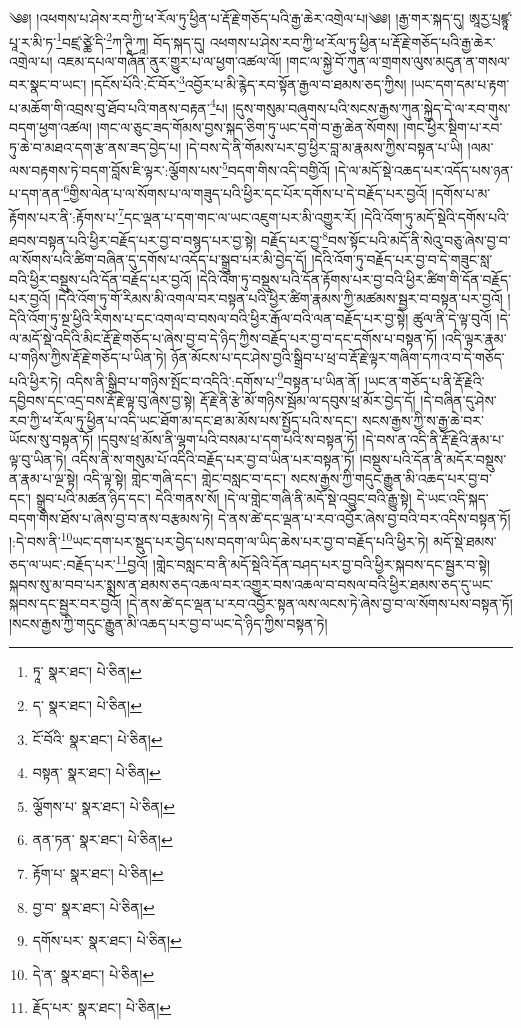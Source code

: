 \setcounter{footnote}{0} 
༄༅། །འཕགས་པ་ཤེས་རབ་ཀྱི་ཕ་རོལ་ཏུ་ཕྱིན་པ་རྡོ་རྗེ་གཅོད་པའི་རྒྱ་ཆེར་འགྲེལ་པ།༄༅། །རྒྱ་གར་སྐད་དུ། ཨཱརྱ་པྲཛྙཱ་པཱ་ར་མི་ཏ་\footnote{ཏཱ་  སྣར་ཐང་།  པེ་ཅིན། }བཛྲ་ཙྪེ་དི་\footnote{ད་  སྣར་ཐང་།  པེ་ཅིན། }ཀ་ཊཱི་ཀཱ། བོད་སྐད་དུ། འཕགས་པ་ཤེས་རབ་ཀྱི་ཕ་རོལ་ཏུ་ཕྱིན་པ་རྡོ་རྗེ་གཅོད་པའི་རྒྱ་ཆེར་འགྲེལ་པ། འཇམ་དཔལ་གཞོན་ནུར་གྱུར་པ་ལ་ཕྱག་འཚལ་ལོ། །གང་ལ་སྐྱེ་བོ་ཀུན་ལ་གྲགས་ལུས་མདུན་ན་གསལ་བར་སྣང་བ་ཡང་། །དངོས་པོའི་:ངོ་བོར་\footnote{ངོ་བོའི་  སྣར་ཐང་།  པེ་ཅིན། }འབྱོར་པ་མི་རྙེད་རབ་སྟོན་རྒྱལ་བ་ཐམས་ཅད་ཀྱིས། །ཡང་དག་དམ་པ་རྟག་པ་མཆོག་གི་འབྲས་བུ་ཐོབ་པའི་གནས་བརྟན་\footnote{བསྟན་  སྣར་ཐང་།  པེ་ཅིན། }པ། །དུས་གསུམ་བཞུགས་པའི་སངས་རྒྱས་ཀུན་སྐྱེད་དེ་ལ་རབ་གུས་བདག་ཕྱག་འཚལ། །གང་ལ་ཅུང་ཟད་གོམས་བྱས་སྐད་ཅིག་ཏུ་ཡང་དགེ་བ་རྒྱ་ཆེན་སོགས། །གང་ཕྱིར་སྡིག་པ་རབ་ཏུ་ཆེ་བ་མཐའ་དག་རྩ་ནས་ཟད་བྱེད་པ། །དེ་བས་དེ་ནི་གོམས་པར་བྱ་ཕྱིར་བླ་མ་རྣམས་ཀྱིས་བསྟན་པ་ཡི། །ལམ་ལས་བརྟགས་ཏེ་བདག་བློས་ཇི་ལྟར་:ལྕོགས་པས་\footnote{ལྕོགས་པ་  སྣར་ཐང་།  པེ་ཅིན། }བདག་གིས་འདི་བགྱིའོ། །དེ་ལ་མདོ་སྡེ་འཆད་པར་འདོད་པས་ཉན་པ་དག་ནན་\footnote{ནན་ཏན་  སྣར་ཐང་།  པེ་ཅིན། }གྱིས་ལེན་པ་ལ་སོགས་པ་ལ་གཟུད་པའི་ཕྱིར་དང་པོར་དགོས་པ་དེ་བརྗོད་པར་བྱའོ། །དགོས་པ་མ་རྟོགས་པར་ནི་:རྟོགས་པ་\footnote{རྟོག་པ་  སྣར་ཐང་།  པེ་ཅིན། }དང་ལྡན་པ་དག་གང་ལ་ཡང་འཇུག་པར་མི་འགྱུར་རོ། །དེའི་འོག་ཏུ་མདོ་སྡེའི་དགོས་པའི་ཐབས་བསྟན་པའི་ཕྱིར་བརྗོད་པར་བྱ་བ་བསྙད་པར་བྱ་སྟེ། བརྗོད་པར་བྱ་\footnote{བྱ་བ་  སྣར་ཐང་།  པེ་ཅིན། }བས་སྟོང་པའི་མདོ་ནི་སེའུ་བཅུ་ཞེས་བྱ་བ་ལ་སོགས་པའི་ཚིག་བཞིན་དུ་དགོས་པ་འདོད་པ་སྒྲུབ་པར་མི་བྱེད་དོ། །དེའི་འོག་ཏུ་བརྗོད་པར་བྱ་བ་དེ་གཟུང་སླ་བའི་ཕྱིར་བསྡུས་པའི་དོན་བརྗོད་པར་བྱའོ། །དེའི་འོག་ཏུ་བསྡུས་པའི་དོན་རྟོགས་པར་བྱ་བའི་ཕྱིར་ཚིག་གི་དོན་བརྗོད་པར་བྱའོ། །དེའི་འོག་ཏུ་གོ་རིམས་མི་འགལ་བར་བསྟན་པའི་ཕྱིར་ཚིག་རྣམས་ཀྱི་མཚམས་སྦྱར་བ་བསྟན་པར་བྱའོ། །དེའི་འོག་ཏུ་སྔ་ཕྱིའི་རིགས་པ་དང་འགལ་བ་བསལ་བའི་ཕྱིར་རྒོལ་བའི་ལན་བརྗོད་པར་བྱ་སྟེ། ཚུལ་ནི་དེ་ལྟ་བུའོ། །དེ་ལ་མདོ་སྡེ་འདིའི་མིང་རྡོ་རྗེ་གཅོད་པ་ཞེས་བྱ་བ་དེ་ཉིད་ཀྱིས་བརྗོད་པར་བྱ་བ་དང་དགོས་པ་བསྟན་ཏོ། །འདི་ལྟར་རྣམ་པ་གཉིས་ཀྱིས་རྡོ་རྗེ་གཅོད་པ་ཡིན་ཏེ། ཉོན་མོངས་པ་དང་ཤེས་བྱའི་སྒྲིབ་པ་ཕྲ་བ་རྡོ་རྗེ་ལྟར་གཞིག་དཀའ་བ་དེ་གཅོད་པའི་ཕྱིར་ཏེ། འདིས་ནི་སྒྲིབ་པ་གཉིས་སྤོང་བ་འདིའི་:དགོས་པ་\footnote{དགོས་པར་  སྣར་ཐང་།  པེ་ཅིན། }བསྟན་པ་ཡིན་ནོ། །ཡང་ན་གཅོད་པ་ནི་རྡོ་རྗེའི་དབྱིབས་དང་འདྲ་བས་རྡོ་རྗེ་ལྟ་བུ་ཞེས་བྱ་སྟེ། རྡོ་རྗེ་ནི་རྩེ་མོ་གཉིས་སྦོམ་ལ་དབུས་ཕྲ་མོར་བྱེད་དོ། །དེ་བཞིན་དུ་ཤེས་རབ་ཀྱི་ཕ་རོལ་ཏུ་ཕྱིན་པ་འདི་ཡང་ཐོག་མ་དང་ཐ་མ་མོས་པས་སྤྱོད་པའི་ས་དང་། སངས་རྒྱས་ཀྱི་ས་རྒྱ་ཆེ་བར་ཡོངས་སུ་བསྟན་ཏོ། །དབུས་ཕྲ་མོས་ནི་ལྷག་པའི་བསམ་པ་དག་པའི་ས་བསྟན་ཏོ། །དེ་བས་ན་འདི་ནི་རྡོ་རྗེའི་རྣམ་པ་ལྟ་བུ་ཡིན་ཏེ། འདིས་ནི་ས་གསུམ་པོ་འདིའི་བརྗོད་པར་བྱ་བ་ཡིན་པར་བསྟན་ཏོ། །བསྡུས་པའི་དོན་ནི་མདོར་བསྡུས་ན་རྣམ་པ་ལྔ་སྟེ། འདི་ལྟ་སྟེ། གླེང་གཞི་དང་། གླེང་བསླང་བ་དང་། སངས་རྒྱས་ཀྱི་གདུང་རྒྱུན་མི་འཆད་པར་བྱ་བ་དང་། སྒྲུབ་པའི་མཚན་ཉིད་དང་། དེའི་གནས་སོ། །དེ་ལ་གླེང་གཞི་ནི་མདོ་སྡེ་འབྱུང་བའི་རྒྱུ་སྟེ། དེ་ཡང་འདི་སྐད་བདག་གིས་ཐོས་པ་ཞེས་བྱ་བ་ནས་བརྩམས་ཏེ། དེ་ནས་ཚེ་དང་ལྡན་པ་རབ་འབྱོར་ཞེས་བྱ་བའི་བར་འདིས་བསྟན་ཏོ། །:དེ་བས་ནི་\footnote{དེ་ན་  སྣར་ཐང་།  པེ་ཅིན། }ཡང་དག་པར་སྡུད་པར་བྱེད་པས་བདག་ལ་ཡིད་ཆེས་པར་བྱ་བ་བརྗོད་པའི་ཕྱིར་ཏེ། མདོ་སྡེ་ཐམས་ཅད་ལ་ཡང་:བརྗོད་པར་\footnote{རྗོད་པར་  སྣར་ཐང་།  པེ་ཅིན། }བྱའོ། །གླེང་བསླང་བ་ནི་མདོ་སྡེའི་དོན་བཤད་པར་བྱ་བའི་ཕྱིར་སྐབས་དང་སྦྱར་བ་སྟེ། སྐབས་སུ་མ་བབ་པར་སྨྲས་ན་ཐམས་ཅད་འཆལ་བར་འགྱུར་བས་འཆལ་བ་བསལ་བའི་ཕྱིར་ཐམས་ཅད་དུ་ཡང་སྐབས་དང་སྦྱར་བར་བྱའོ། །དེ་ནས་ཚེ་དང་ལྡན་པ་རབ་འབྱོར་སྟན་ལས་ལངས་ཏེ་ཞེས་བྱ་བ་ལ་སོགས་པས་བསྟན་ཏོ། །སངས་རྒྱས་ཀྱི་གདུང་རྒྱུན་མི་འཆད་པར་བྱ་བ་ཡང་དེ་ཉིད་ཀྱིས་བསྟན་ཏེ། 